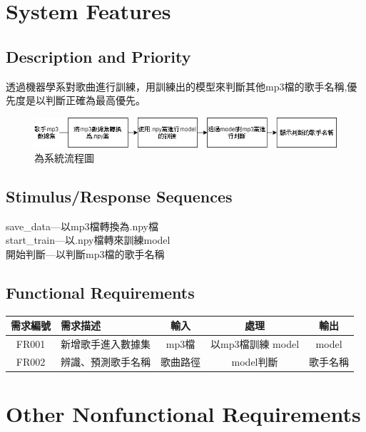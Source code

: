 \documentclass{article}
\begin{document}
\begin{CJK}{UTF8}{bkai}
\section{\huge\bf \color{blue}  System Features }
\subsection{\Large Description and Priority }
	
	透過機器學系對歌曲進行訓練，用訓練出的模型來判斷其他mp3檔的歌手名稱,優先度是以判斷正確為最高優先。
\begin{figure}[h]
\begin{center}
\includegraphics[width=14cm]{FS.jpg}
\end{center}
\caption{為系統流程圖}
\label{fig:2}
\end{figure}

\subsection{\Large Stimulus/Response Sequences}
	save\_data---以mp3檔轉換為.npy檔\\
	start\_train---以.npy檔轉來訓練model\\
	開始判斷---以判斷mp3檔的歌手名稱\\
	
\subsection{ \Large Functional Requirements}
 \begin{center}
	\begin{tabular}{|c|p{5cm}|c|c|c|}\hline
		需求編號 &  需求描述&輸入&處理&輸出 \\ \hline
		FR001 &  新增歌手進入數據集&mp3檔&以mp3檔訓練 model&model \\ \hline
		FR002 &  辨識、預測歌手名稱&歌曲路徑&model判斷&歌手名稱\\\hline
	\end{tabular}
\end{center}

\section{\huge\bf  \color {blue}  Other Nonfunctional Requirements }

\end{CJK}
\end{document}
